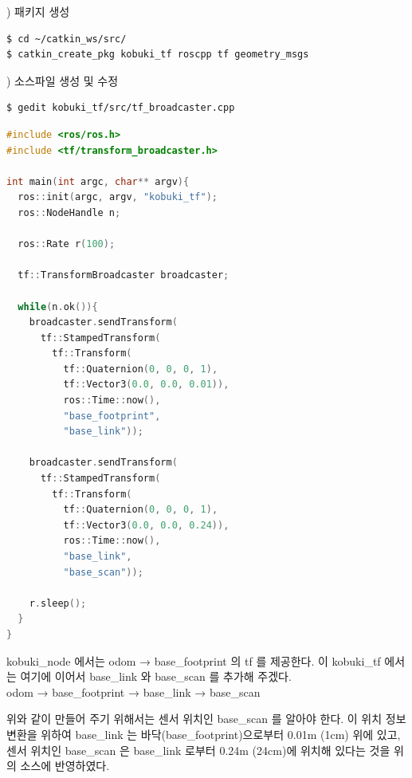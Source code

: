 \setcounter{num}{0}

\vspace{\baselineskip}
\noindent
{}
\thenum) 패키지 생성

\vspace{\baselineskip}
\begin{lstlisting}[language=ROS]
$ cd ~/catkin_ws/src/
$ catkin_create_pkg kobuki_tf roscpp tf geometry_msgs
\end{lstlisting}


\vspace{\baselineskip}
\noindent
{}
\thenum) 소스파일 생성 및 수정

\vspace{\baselineskip}
\begin{lstlisting}[language=ROS]
$ gedit kobuki_tf/src/tf_broadcaster.cpp 
\end{lstlisting}


\vspace{\baselineskip}
\begin{lstlisting}[language=C++]
#include <ros/ros.h>
#include <tf/transform_broadcaster.h>

int main(int argc, char** argv){
  ros::init(argc, argv, "kobuki_tf");
  ros::NodeHandle n;

  ros::Rate r(100);

  tf::TransformBroadcaster broadcaster;

  while(n.ok()){
    broadcaster.sendTransform(
      tf::StampedTransform(
        tf::Transform(
          tf::Quaternion(0, 0, 0, 1),
          tf::Vector3(0.0, 0.0, 0.01)),
          ros::Time::now(),
          "base_footprint",
          "base_link"));

    broadcaster.sendTransform(
      tf::StampedTransform(
        tf::Transform(
          tf::Quaternion(0, 0, 0, 1),
          tf::Vector3(0.0, 0.0, 0.24)),
          ros::Time::now(),
          "base_link",
          "base_scan"));

    r.sleep();
  }
}
\end{lstlisting}


kobuki\_node 에서는 odom → base\_footprint 의 tf 를 제공한다. 이 kobuki\_tf 에서는 여기에 이어서 base\_link 와 base\_scan 를 추가해 주겠다.\\

odom → base\_footprint  → base\_link → base\_scan

위와 같이 만들어 주기 위해서는 센서 위치인 base\_scan 를 알아야 한다. 이 위치 정보 변환을 위하여 base\_link 는 바닥(base\_footprint)으로부터 0.01m (1cm) 위에 있고, 센서 위치인 base\_scan 은 base\_link 로부터 0.24m (24cm)에 위치해 있다는 것을 위의 소스에 반영하였다.

